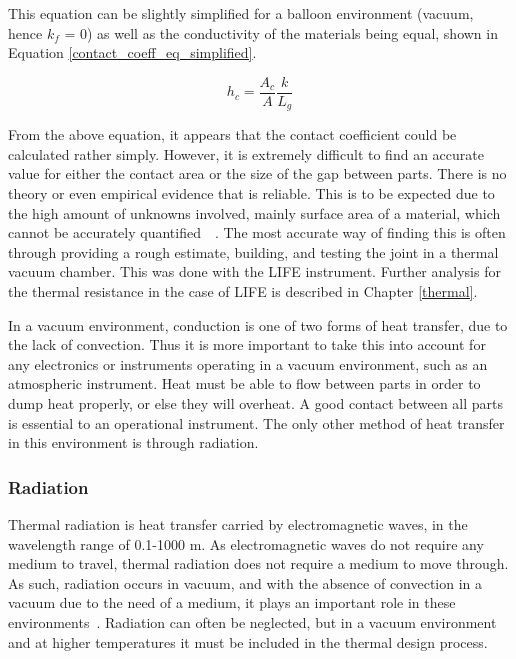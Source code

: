 This equation can be slightly simplified for a balloon environment (vacuum, hence $k_f$ = 0) as well as the conductivity of the materials being equal, shown in Equation \ref{contact_coeff_eq_simplified}.

\begin{equation}\label{contact_coeff_eq_simplified}
    h_c = \frac{A_c}{A}\frac{k}{L_g}
\end{equation}

From the above equation, it appears that the contact coefficient could be calculated rather simply. However, it is extremely difficult to find an accurate value for either the contact area or the size of the gap between parts. There is no theory or even empirical evidence that is reliable. This is to be expected due to the high amount of unknowns involved, mainly surface area of a material, which cannot be accurately quantified~\citep{Heat_Transfer_Resistance}~\citep{stephane_thermal_contact}. The most accurate way of finding this is often through providing a rough estimate, building, and testing the joint in a thermal vacuum chamber. This was done with the LIFE instrument. Further analysis for the thermal resistance in the case of LIFE is described in Chapter \ref{thermal}.

In a vacuum environment, conduction is one of two forms of heat transfer, due to the lack of convection. Thus it is more important to take this into account for any electronics or instruments operating in a vacuum environment, such as an atmospheric instrument. Heat must be able to flow between parts in order to dump heat properly, or else they will overheat. A good contact between all parts is essential to an operational instrument. The only other method of heat transfer in this environment is through radiation. 

\subsubsection{Radiation}
Thermal radiation is heat transfer carried by electromagnetic waves, in the wavelength range of 0.1-1000 \textmu m. As electromagnetic waves do not require any medium to travel, thermal radiation does not require a medium to move through. As such, radiation occurs in vacuum, and with the absence of convection in a vacuum due to the need of a medium, it plays an important role in these environments~\citep{Heat_Transfer_Basics}. Radiation can often be neglected, but in a vacuum environment and at higher temperatures it must be included in the thermal design process.

